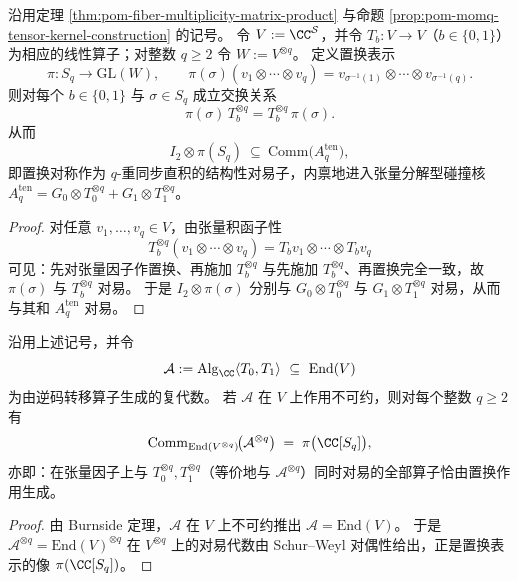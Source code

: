 \begin{theorem}\label{thm:pom-momq-permutation-symmetry}
沿用定理 \ref{thm:pom-fiber-multiplicity-matrix-product} 与命题 \ref{prop:pom-momq-tensor-kernel-construction} 的记号。
令 \(V:=\CC^{\mathcal S}\)，并令 \(T_b:V\to V\)（\(b\in\{0,1\}\)）为相应的线性算子；对整数 \(q\ge 2\) 令 \(W:=V^{\otimes q}\)。
定义置换表示
\[
\pi:S_q\to \mathrm{GL}(W),
\qquad
\pi(\sigma)(v_1\otimes\cdots\otimes v_q)
=v_{\sigma^{-1}(1)}\otimes\cdots\otimes v_{\sigma^{-1}(q)}.
\]
则对每个 \(b\in\{0,1\}\) 与 \(\sigma\in S_q\) 成立交换关系
\[
\pi(\sigma)\,T_b^{\otimes q}=T_b^{\otimes q}\,\pi(\sigma).
\]
从而
\[
I_2\otimes \pi(S_q)\ \subseteq\ \mathrm{Comm}\bigl(A_q^{\mathrm{ten}}\bigr),
\]
即置换对称作为 \(q\)-重同步直积的结构性对易子，内禀地进入张量分解型碰撞核 \(A_q^{\mathrm{ten}}=G_0\otimes T_0^{\otimes q}+G_1\otimes T_1^{\otimes q}\)。
\end{theorem}
\begin{proof}
对任意 \(v_1,\dots,v_q\in V\)，由张量积函子性
\[
T_b^{\otimes q}(v_1\otimes\cdots\otimes v_q)=T_bv_1\otimes\cdots\otimes T_bv_q
\]
可见：先对张量因子作置换、再施加 \(T_b^{\otimes q}\) 与先施加 \(T_b^{\otimes q}\)、再置换完全一致，故 \(\pi(\sigma)\) 与 \(T_b^{\otimes q}\) 对易。
于是 \(I_2\otimes \pi(\sigma)\) 分别与 \(G_0\otimes T_0^{\otimes q}\) 与 \(G_1\otimes T_1^{\otimes q}\) 对易，从而与其和 \(A_q^{\mathrm{ten}}\) 对易。
\end{proof}

\begin{theorem}\label{thm:pom-momq-schur-weyl-commutant}
沿用上述记号，并令
\[
\mathcal A:=\mathrm{Alg}_{\CC}\langle T_0,T_1\rangle\ \subseteq\ \mathrm{End}(V)
\]
为由逆码转移算子生成的复代数。
若 \(\mathcal A\) 在 \(V\) 上作用不可约，则对每个整数 \(q\ge 2\) 有
\[
\mathrm{Comm}_{\mathrm{End}(V^{\otimes q})}\!\bigl(\mathcal A^{\otimes q}\bigr)
\;=\;
\pi\bigl(\CC[S_q]\bigr),
\]
亦即：在张量因子上与 \(T_0^{\otimes q},T_1^{\otimes q}\)（等价地与 \(\mathcal A^{\otimes q}\)）同时对易的全部算子恰由置换作用生成。
\end{theorem}
\begin{proof}
由 Burnside 定理，\(\mathcal A\) 在 \(V\) 上不可约推出 \(\mathcal A=\mathrm{End}(V)\)。
于是 \(\mathcal A^{\otimes q}=\mathrm{End}(V)^{\otimes q}\) 在 \(V^{\otimes q}\) 上的对易代数由 Schur--Weyl 对偶性给出，正是置换表示的像 \(\pi(\CC[S_q])\)。
\end{proof}
